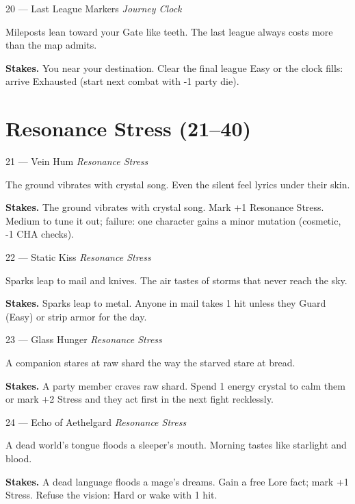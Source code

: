 \begin{encounterentry}{20 --- Last League Markers}
\textit{Journey Clock}

Mileposts lean toward your Gate like teeth. The last league always costs more than the map admits.

\textbf{Stakes.} You near your destination. Clear the final league Easy or the clock fills: arrive Exhausted (start next combat with -1 party die).
\end{encounterentry}

\section{Resonance Stress (21--40)}

\begin{encounterentry}{21 --- Vein Hum}
\textit{Resonance Stress}

The ground vibrates with crystal song. Even the silent feel lyrics under their skin.

\textbf{Stakes.} The ground vibrates with crystal song. Mark +1 Resonance Stress. Medium to tune it out; failure: one character gains a minor mutation (cosmetic, -1 CHA checks).
\end{encounterentry}

\begin{encounterentry}{22 --- Static Kiss}
\textit{Resonance Stress}

Sparks leap to mail and knives. The air tastes of storms that never reach the sky.

\textbf{Stakes.} Sparks leap to metal. Anyone in mail takes 1 hit unless they Guard (Easy) or strip armor for the day.
\end{encounterentry}

\begin{encounterentry}{23 --- Glass Hunger}
\textit{Resonance Stress}

A companion stares at raw shard the way the starved stare at bread.

\textbf{Stakes.} A party member craves raw shard. Spend 1 energy crystal to calm them or mark +2 Stress and they act first in the next fight recklessly.
\end{encounterentry}

\begin{encounterentry}{24 --- Echo of Aethelgard}
\textit{Resonance Stress}

A dead world's tongue floods a sleeper's mouth. Morning tastes like starlight and blood.

\textbf{Stakes.} A dead language floods a mage's dreams. Gain a free Lore fact; mark +1 Stress. Refuse the vision: Hard or wake with 1 hit.
\end{encounterentry}

